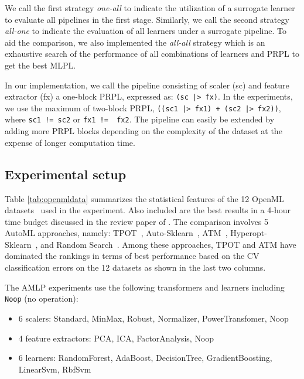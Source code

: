\documentclass{juliacon}
\begin{document}
We call the first strategy \emph{one-all} to indicate the utilization of a
surrogate learner to evaluate all pipelines in the first stage.
Similarly, we call the second strategy \emph{all-one}
to indicate the evaluation of all learners under a
surrogate pipeline.  To aid the comparison, we also implemented the
\emph{all-all} strategy which is an exhaustive search of the performance of all
combinations of learners and PRPL to get the best MLPL.

\vskip 6pt

In our implementation, we call the pipeline consisting of scaler (sc) and
feature extractor (fx) a one-block PRPL, expressed as: \texttt{(sc~|>~fx)}.
In the experiments, we use the maximum of two-block PRPL,
\texttt{((sc1~|>~fx1)~+~(sc2~|>~fx2))}, where \texttt{sc1~!=~sc2} or
\texttt{fx1~!=~ fx2}.  The pipeline can easily be extended by adding more PRPL
blocks depending on the complexity of the dataset at the expense of longer
computation time.

\subsection{Experimental setup}



Table \ref{tab:openmldata} summarizes the statistical features of the 12 OpenML
datasets~\cite{openml} used in the experiment.  Also included are the best
results in a 4-hour time budget  discussed in the review paper
of \cite{zoller2019}.  The comparison involves 5 AutoML approaches, namely:
TPOT~\cite{tpot2016}, Auto-Sklearn~\cite{Feurer:AML2019Chp6,Feurer:NIPS2015},
ATM~\cite{atm2017}, Hyperopt-Sklearn~\cite{bergstra2011nips,bergstra2012}, and
Random Search~\cite{anderson1953}.  Among these approaches, TPOT and ATM have
dominated the rankings in terms of best performance based on the
CV classification errors on the 12 datasets as shown in the last two columns.

\vskip 6pt

The AMLP experiments use the following transformers and learners including
\texttt{Noop} (no operation):
\begin{itemize}
  \item 6 scalers: Standard, MinMax, Robust, Normalizer, PowerTransfomer, Noop
  \item 4 feature extractors: PCA, ICA, FactorAnalysis, Noop
  \item 6 learners: RandomForest, AdaBoost, DecisionTree, GradientBoosting, LinearSvm, RbfSvm
\end{itemize}
\end{document}

